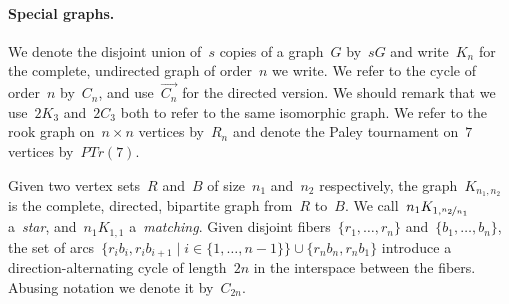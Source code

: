 \documentclass[english,a4paper]{article}
\theoremstyle{plain}
\theoremstyle{definition}
\newcommand{\clique}[1]{\ensuremath{K_{#1}}}
\newcommand{\cycle}[1]{\ensuremath{C_{#1}}}
\newcommand{\disjointCliques}[2]{\ensuremath{#1 \clique{#2}}}
\newcommand{\disjointCycles}[2]{\ensuremath{#1 \cycle{#2}}}
\newcommand{\rookGraph}[1]{\ensuremath{R_{#1}}}
\newcommand{\matching}[1]{\ensuremath{#1 K_{1,1}}}
\begin{document}
\paragraph{Special graphs.}
We denote the disjoint union of~$s$ copies of a graph~$G$ by~$sG$ and write~$\clique{n}$ for the complete, undirected graph of order~$n$ we write.
We refer to the cycle of order~$n$ by~$\cycle{n}$, and use~$\overrightarrow{\cycle{n}}$ for the directed version.
We should remark that we use~$\disjointCliques{2}{3}$ and~$\disjointCycles{2}{3}$ both to refer to the same isomorphic graph.
We refer to the rook graph on~$n\times n$ vertices by~$\rookGraph{n}$ and denote the Paley tournament on~$7$ vertices by~$PTr(7)$.

Given two vertex sets~$R$ and~$B$ of size~$n_1$ and~$n_2$ respectively, the graph~$\clique{n_1,n_2}$ is the complete, directed, bipartite graph from~$R$ to~$B$.
We call~$\disjointCliques{n_1}{1,\nicefrac{n_2}{n_1}}$ a~\emph{star}, and~$\matching{n_1}$ a~\emph{matching}.
Given disjoint fibers~$\{r_1,\dots,r_n\}$ and~$\{b_1,\dots,b_n\}$, the set of arcs~$\{r_ib_i, r_ib_{i+1} \mid i \in \{1,\dots, n-1\}\} \cup \{r_nb_n,r_nb_1\}$ introduce a direction-alternating cycle of length~$2n$ in the interspace between the fibers.
Abusing notation we denote it by~$\cycle{2n}$.
\end{document}
